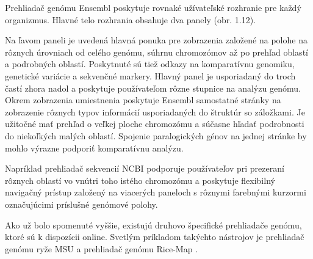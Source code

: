 Prehliadač genómu Ensembl poskytuje rovnaké užívateľské rozhranie pre každý organizmus.
Hlavné telo rozhrania obsahuje dva panely (obr. 1.12).

Na ľavom paneli je uvedená hlavná ponuka pre zobrazenia založené na polohe na rôznych úrovniach od celého genómu, súhrnu chromozómov až po prehľad oblastí a podrobných oblastí.
Poskytnuté sú tiež odkazy na komparatívnu genomiku, genetické variácie a sekvenčné markery.
Hlavný panel je usporiadaný do troch častí zhora nadol a poskytuje používateľom rôzne stupnice na analýzu genómu.
Okrem zobrazenia umiestnenia poskytuje Ensembl samostatné stránky na zobrazenie rôznych typov informácií usporiadaných do štruktúr so záložkami.
Je užitočné mať prehľad o veľkej ploche chromozómu a súčasne hľadať podrobnosti do niekoľkých malých oblastí.
Spojenie paralogických génov na jednej stránke by mohlo výrazne podporiť komparatívnu analýzu.

Napríklad prehliadač sekvencií NCBI podporuje používateľov pri prezeraní rôznych oblastí vo vnútri toho istého chromozómu a poskytuje flexibilný navigačný prístup založený na viacerých paneloch s rôznymi farebnými kurzormi označujúcimi príslušné genómové polohy.

Ako už bolo spomenuté vyššie, existujú druhovo špecifické prehliadače genómu, ktoré sú k dispozícii online.
Svetlým príkladom takýchto nástrojov je prehliadač genómu ryže MSU a prehliadač genómu Rice-Map \cite{RMgb}.

